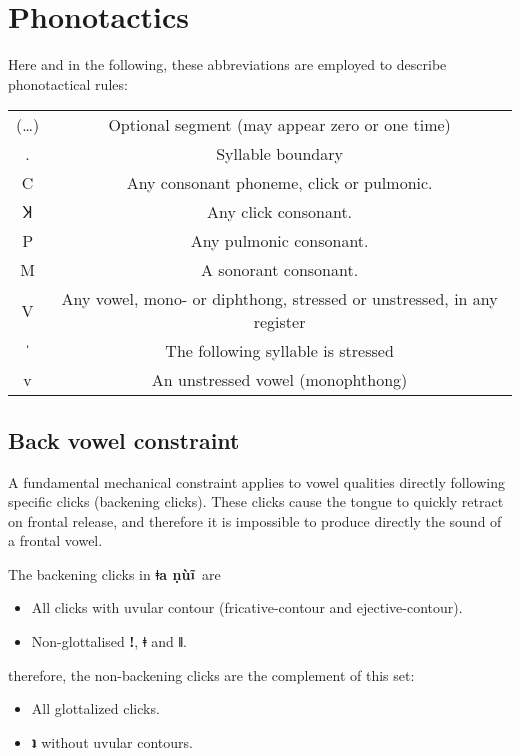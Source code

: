 \documentclass[11pt]{book}
\newcommand{\qcn}[1]{\textbf{#1}}
\newcommand{\langname}{\qcn{ǂa ṇùĩ}~}
\begin{document}
\section{Phonotactics}

\newcommand{\stress}{ˈ}

Here and in the following, these abbreviations are employed to describe phonotactical rules:

\begin{center}
\begin{tabular}{cc}
	(\ldots) & Optional segment (may appear zero or one time)\\
	. & Syllable boundary \\
	C & Any consonant phoneme, click or pulmonic.\\
	Ʞ & Any click consonant. \\
	P & Any pulmonic consonant. \\
	M & A sonorant consonant.\\
	V & Any vowel, mono- or diphthong, stressed or unstressed, in any register \\
 \stress{} & The following syllable is stressed \\
	v & An unstressed vowel (monophthong) 
\end{tabular}
\end{center}

\subsection{Back vowel constraint}\label{sec:backvowelconstraint}

A fundamental mechanical constraint applies to vowel qualities directly following specific clicks (backening clicks). These clicks cause the tongue to quickly retract on frontal release, and therefore it is impossible to produce directly the sound of a frontal vowel. 

The backening clicks in \langname are

\begin{itemize}
	\item All clicks with uvular contour (fricative-contour and ejective-contour).
	\item Non-glottalised \qcn{ǃ}, \qcn{ǂ} and \qcn{ǁ}.
\end{itemize}

therefore, the non-backening clicks are the complement of this set:

\begin{itemize}
	\item All glottalized clicks.
	\item \qcn{ʇ} without uvular contours.
\end{itemize}
\end{document}
